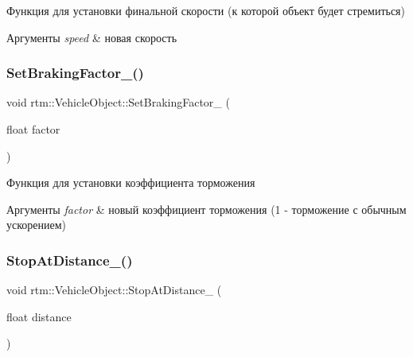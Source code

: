 Функция для установки финальной скорости (к которой объект будет стремиться) 


\begin{DoxyParams}{Аргументы}
{\em speed} & новая скорость \\
\hline
\end{DoxyParams}
\mbox{\label{classrtm_1_1_vehicle_object_a3c2db832bf74ea5bd226e98e24b3da4b}} 
\subsubsection{\texorpdfstring{Set\+Braking\+Factor\+\_\+()}{SetBrakingFactor\_()}}
{\footnotesize\ttfamily void rtm\+::\+Vehicle\+Object\+::\+Set\+Braking\+Factor\+\_\+ (\begin{DoxyParamCaption}\item[{float}]{factor }\end{DoxyParamCaption})\hspace{0.3cm}{\ttfamily [protected]}}



Функция для установки коэффициента торможения 


\begin{DoxyParams}{Аргументы}
{\em factor} & новый коэффициент торможения (1 -\/ торможение с обычным ускорением) \\
\hline
\end{DoxyParams}
\mbox{\label{classrtm_1_1_vehicle_object_a124909b0d2443d501d9b1eb8d359ad5a}} 
\subsubsection{\texorpdfstring{Stop\+At\+Distance\+\_\+()}{StopAtDistance\_()}}
{\footnotesize\ttfamily void rtm\+::\+Vehicle\+Object\+::\+Stop\+At\+Distance\+\_\+ (\begin{DoxyParamCaption}\item[{float}]{distance }\end{DoxyParamCaption})\hspace{0.3cm}{\ttfamily [protected]}}



